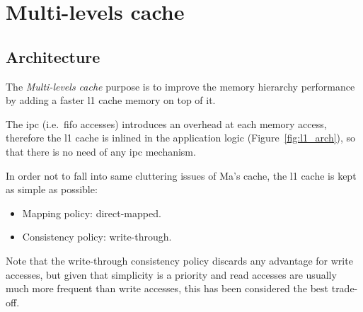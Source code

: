 \documentclass[11pt,a4paper,oneside]{memoir}
\begin{document}

\section{Multi-levels cache}
\subsection{Architecture}
The \emph{Multi-levels cache} purpose is to improve the memory hierarchy
performance by adding a faster \ac{l1} cache memory on top of it.

The \ac{ipc} (i.e.\ \ac{fifo} accesses) introduces an
overhead at each memory access, therefore the \ac{l1} cache is inlined in the
application logic (Figure~\ref{fig:l1_arch}), so that there is no need of any
\ac{ipc} mechanism.

In order not to fall into same cluttering issues of Ma's cache, the \ac{l1}
cache is kept as simple as possible:
\begin{itemize}
	\item Mapping policy: direct-mapped.
	\item Consistency policy: write-through.
\end{itemize}

Note that the write-through consistency policy discards any advantage for write
accesses, but given that simplicity is a priority and read accesses are usually
much more frequent than write accesses, this has been considered the best
trade-off.
\end{document}
